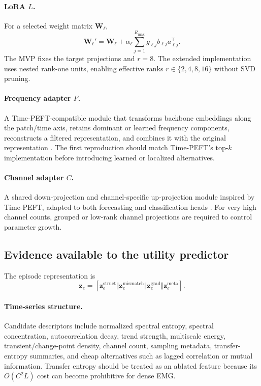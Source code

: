 \documentclass[10pt]{article}
\newcommand{\z}{\mathbf{z}}
\newcommand{\W}{\mathbf{W}}
\begin{document}
\paragraph{LoRA $L$.} For a selected weight matrix $\W_{\ell}$,
\begin{equation}
\W_{\ell}'=\W_{\ell}+\alpha_{\ell}\sum_{j=1}^{R_{\max}}g_{\ell j}b_{\ell j}a_{\ell j}^{\top}.
\end{equation}
The MVP fixes the target projections and $r=8$. The extended implementation uses nested rank-one units, enabling effective ranks $r\in\{2,4,8,16\}$ without SVD pruning.

\paragraph{Frequency adapter $F$.} A Time-PEFT-compatible module that transforms backbone embeddings along the patch/time axis, retains dominant or learned frequency components, reconstructs a filtered representation, and combines it with the original representation \citep{na2026timepeft}. The first reproduction should match Time-PEFT's top-$k$ implementation before introducing learned or localized alternatives.

\paragraph{Channel adapter $C$.} A shared down-projection and channel-specific up-projection module inspired by Time-PEFT, adapted to both forecasting and classification heads \citep{na2026timepeft}. For very high channel counts, grouped or low-rank channel projections are required to control parameter growth.

\subsection{Evidence available to the utility predictor}

The episode representation is
\begin{equation}
\z_e=[\z_e^{\mathrm{struct}}\Vert\z_e^{\mathrm{mismatch}}\Vert\z_e^{\mathrm{grad}}\Vert\z_e^{\mathrm{meta}}].
\end{equation}

\paragraph{Time-series structure.} Candidate descriptors include normalized spectral entropy, spectral concentration, autocorrelation decay, trend strength, multiscale energy, transient/change-point density, channel count, sampling metadata, transfer-entropy summaries, and cheap alternatives such as lagged correlation or mutual information. Transfer entropy should be treated as an ablated feature because its $O(C^2L)$ cost can become prohibitive for dense EMG.
\end{document}
